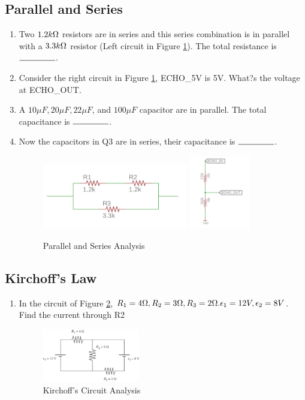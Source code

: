 \documentclass{article}
\newcommand{\ans}{$\rule{1.5cm}{0.15mm}$}
\begin{document}
\subsection{Parallel and Series}
\begin{enumerate}
	\item Two $1.2 k \ohm$ resistors are in series and this series combination is in parallel with a $3.3 k\ohm$ resistor (Left circuit in Figure \ref{fig:parallel}). The total resistance is \ans.
	\item Consider the right circuit in Figure \ref{fig:parallel}, ECHO\_5V is 5V. What?s the voltage at ECHO\_OUT.
	\item A $10 \mu F, 20 \mu F, 22 \mu F$, and $100 \mu F$ capacitor are in parallel. The total capacitance is \ans.
	\item Now the capacitors in Q3 are in series, their capacitance is \ans.
	
	\begin{figure}[!h]
		\center
		\includegraphics[width=0.6\textwidth, keepaspectratio]{parallel}
		\includegraphics[width=0.25\textwidth, keepaspectratio]{vdivide}
		\caption{Parallel and Series Analysis}
		\label{fig:parallel}
	\end{figure}
	
	
\end{enumerate}
\subsection{Kirchoff's Law}
\begin{enumerate}
	\item In the circuit of Figure \ref{fig:kirchof}, $R_1=4\ohm ,R_2=3\ohm,R_3=2\ohm. \epsilon_1=12V, \epsilon_2=8V$. Find the current through R2
	\begin{figure}
		\center
		\includegraphics[width=0.4\textwidth, keepaspectratio]{kirchof}
		\caption{Kirchoff's Circuit Analysis}
		\label{fig:kirchof}
	\end{figure}
\end{enumerate}
\end{document}
